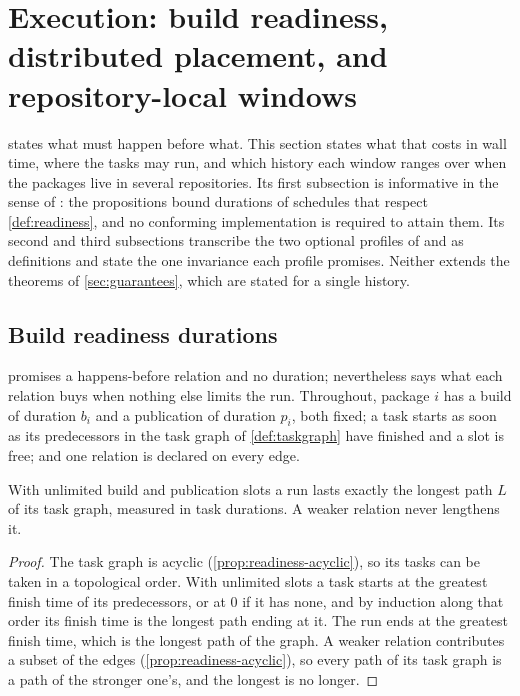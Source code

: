 \section{Execution: build readiness, distributed placement, and repository-local windows}
\label{sec:execution}

 states what must happen before what. This section states
what that costs in wall time, where the tasks may run, and which history each
window ranges over when the packages live in several repositories. Its first
subsection is informative in the sense of : the propositions bound
durations of schedules that respect \cref{def:readiness}, and no conforming
implementation is required to attain them. Its second and third subsections
transcribe the two optional profiles of  and  as definitions
and state the one invariance each profile promises. Neither extends the
theorems of \cref{sec:guarantees}, which are stated for a single history.

\subsection{Build readiness durations}
\label{sec:exec-durations}

 promises a happens-before relation and no duration; 
nevertheless says what each relation buys when nothing else limits the run.
Throughout, package $i$ has a build of duration $b_i$ and a publication of
duration $p_i$, both fixed; a task starts as soon as its predecessors in the
task graph of \cref{def:taskgraph} have finished and a slot is free; and one
relation is declared on every edge.

\begin{proposition}
\label{prop:exec-longest}
With unlimited build and publication slots a run lasts exactly the longest
path $L$ of its task graph, measured in task durations. A weaker relation
never lengthens it.
\end{proposition}

\begin{proof}
The task graph is acyclic (\cref{prop:readiness-acyclic}), so its tasks can be
taken in a topological order. With unlimited slots a task starts at the
greatest finish time of its predecessors, or at $0$ if it has none, and by
induction along that order its finish time is the longest path ending at it.
The run ends at the greatest finish time, which is the longest path of the
graph. A weaker relation contributes a subset of the edges
(\cref{prop:readiness-acyclic}), so every path of its task graph is a path of
the stronger one's, and the longest is no longer.
\end{proof}

